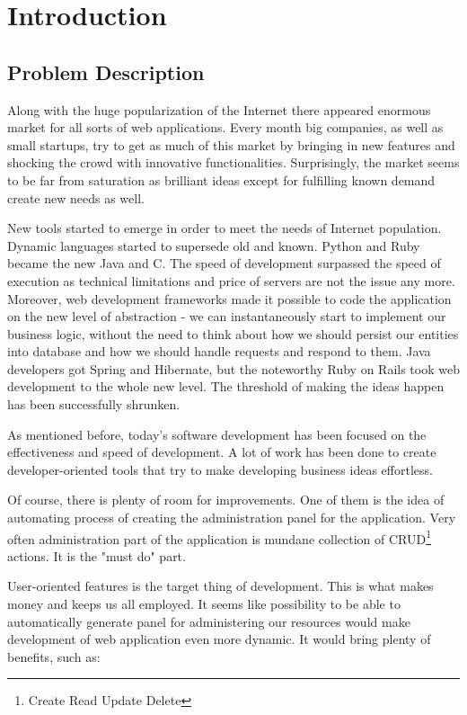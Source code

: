 
\chapter{Introduction}
  \section{Problem Description}
  Along with the huge popularization of the Internet there appeared enormous market for all sorts of web applications. Every month big companies, as well as small startups, try to get as much of this market by bringing in new features and shocking the crowd with innovative functionalities. Surprisingly, the market seems to be far from saturation as brilliant ideas except for fulfilling known demand create new needs as well.

  New tools started to emerge in order to meet the needs of Internet population. Dynamic languages started to supersede old and known. Python and Ruby became the new Java and C. The speed of development surpassed the speed of execution as technical limitations and price of servers are not the issue any more. Moreover, web development frameworks made it possible to code the application on the new level of abstraction - we can instantaneously start to implement our business logic, without the need to think about how we should persist our entities into database and how we should handle requests and respond to them. Java developers got Spring and Hibernate, but the noteworthy Ruby on Rails took web development to the whole new level. The threshold of making the ideas happen has been successfully shrunken.
  
  As mentioned before, today's software development has been focused on the effectiveness and speed of development. A lot of work has been done to create developer-oriented tools that try to make developing business ideas effortless.
  
  Of course, there is plenty of room for improvements. One of them is the idea of automating process of creating the administration panel for the application. Very often administration part of the application is mundane collection of CRUD\footnote{Create Read Update Delete} actions. It is the "must do" part. 
  
   User-oriented features is the target thing of development. This is what makes money and keeps us all employed. It seems like possibility to be able to automatically generate panel for administering our resources would make development of web application even more dynamic. It would bring plenty of benefits, such as:
  
